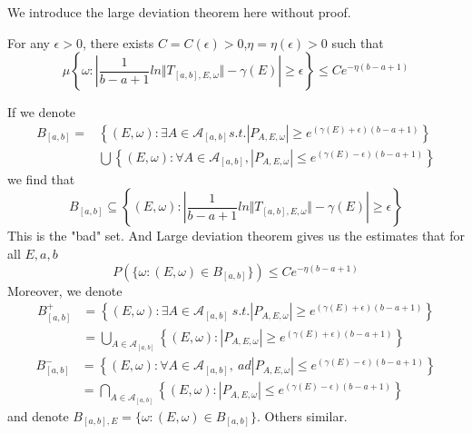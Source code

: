 We introduce the large deviation theorem here without proof.\cite{bucaj2017localization}
\begin{thm}
  For any $\epsilon>0$, there exists $C=C(\epsilon)>0$,$\eta=\eta(\epsilon)>0$ such that
  \[
  \mu \left\{ \omega:\left\vert \frac{1}{b-a+1} ln\Vert T_{[a,b],E,\omega}\Vert-\gamma(E) \right\vert\geq\epsilon
   \right\} \leq Ce^{-\eta (b-a+1)}
  \]
\end{thm}
\begin{remark}
  If we denote
\[
\begin{split}
    B_{[a,b]}=&\left\{(E,\omega):\exists A\in\mathcal{A}_{[a,b]} s.t. |P_{A,E,\omega}|\geq e^{(\gamma(E)+\epsilon)(b-a+1)}\right\} \\
    &\bigcup \left\{(E,\omega):\forall A\in\mathcal{A}_{[a,b]}, |P_{A,E,\omega}|\leq e^{(\gamma(E)-\epsilon)(b-a+1)}\right\}
\end{split}
\]
  we find that
  \[
    B_{[a,b]}\subseteq\left\{(E,\omega):\left\vert\frac{1}{b-a+1} ln\Vert T_{[a,b],E,\omega}\Vert-\gamma(E)\right\vert \geq\epsilon \right\}
  \]
  This is the "bad" set. And Large deviation theorem gives us the estimates that for all $E,a,b$
\begin{equation}\label{ldt}
  P(\{\omega:(E,\omega)\in B_{[a,b]}\})\leq Ce^{-\eta(b-a+1)}
\end{equation}
Moreover, we denote
\[
  \begin{split}
    B_{[a,b]}^{+}&=\left\{(E,\omega):\exists A\in\mathcal{A}_{[a,b]}~s.t. |P_{A,E,\omega}|\geq e^{(\gamma(E)+\epsilon)(b-a+1)}\right\}\\
    &=\bigcup_{A\in\mathcal{A}_{[a,b]}}\left\{(E,\omega):|P_{A,E,\omega}|\geq e^{(\gamma(E)+\epsilon)(b-a+1)}\right\}
  \end{split}
\]
\[
  \begin{split}
    B_{[a,b]}^{-}&=\left\{(E,\omega):\forall A\in\mathcal{A}_{[a,b]},~ad|P_{A,E,\omega}|\leq e^{(\gamma(E)-\epsilon)(b-a+1)}\right\}\\
    &=\bigcap_{A\in\mathcal{A}_{[a,b]}}\left\{(E,\omega):|P_{A,E,\omega}|\leq e^{(\gamma(E)-\epsilon)(b-a+1)}\right\}
  \end{split}
\]
and denote $B_{[a,b],E}=\{\omega:(E,\omega)\in B_{[a,b]}\}$. Others similar.
\end{remark}

